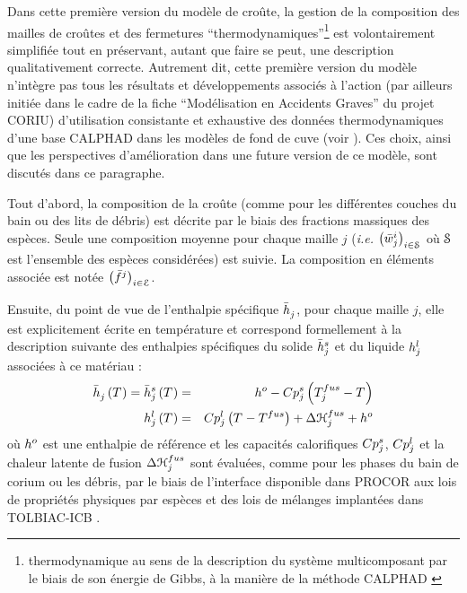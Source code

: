 Dans cette première version du modèle de croûte, la gestion de la composition des mailles de croûtes et des fermetures ``thermodynamiques''\footnote{thermodynamique au sens de la description du système multicomposant par le biais de son énergie de Gibbs, à la manière de la méthode CALPHAD \cite{Lukas2007}} est volontairement simplifiée tout en préservant, autant que faire se peut, une description qualitativement correcte. Autrement dit, cette première version du modèle n'intègre pas tous les résultats et développements associés à l'action (par ailleurs initiée dans le cadre de la fiche ``Modélisation en Accidents Graves'' du projet CORIU) d'utilisation consistante et exhaustive des données thermodynamiques d'une base CALPHAD dans les modèles de fond de cuve (voir \cite{LeTellier2016b,Tiwari2018,LeTellier2019}). Ces choix, ainsi que les perspectives d'amélioration dans une future version de ce modèle, sont discutés dans ce paragraphe.

Tout d'abord, la composition de la croûte (comme pour les différentes couches du bain ou des lits de débris) est décrite par le biais des fractions massiques des espèces. Seule une composition moyenne pour chaque maille $j$  (\textit{i.e.} $\left(\avMassFraction[i]{j}\right)_{i\in \speciesSet}$ où $\speciesSet$ est l'ensemble des espèces considérées) est suivie. La composition en éléments associée est notée $\left(\elementMassFraction[j]{}\right)_{i\in\elementSet}$.

Ensuite, du point de vue de l'enthalpie spécifique $\avMassEnthalpy{j}$, pour chaque maille $j$, elle est explicitement écrite en température et correspond formellement à la description suivante des enthalpies spécifiques du solide $\avMassEnthalpy[s]{j}$ et du liquide $\massEnthalpy[l]{j}$ associées à ce matériau :
\begin{eqnarray}
 \avMassEnthalpy{j} \left(\temperature{}\right) = \avMassEnthalpy[s]{j} \left(\temperature{}\right) &=& \massEnthalpy[o]{} - \heatCp[s]{j} \left(\temperature[fus]{j} - \temperature{}\right) \\
 \massEnthalpy[l]{j} \left(\temperature{}\right) &=& \heatCp[l]{j} \left(\temperature{} - \temperature[fus]{}\right) + \dEnthalpy[fus]{j} + \massEnthalpy[o]{}
\end{eqnarray}
où $\massEnthalpy[o]{}$ est une enthalpie de référence et les capacités calorifiques $\heatCp[s]{j}$, $\heatCp[l]{j}$ et la chaleur latente de fusion $\dEnthalpy[fus]{j}$ sont évaluées, comme pour les phases du bain de corium ou les débris, par le biais de l'interface disponible dans PROCOR aux lois de propriétés physiques par espèces et des lois de mélanges implantées dans TOLBIAC-ICB \cite{Spindler2006}.

